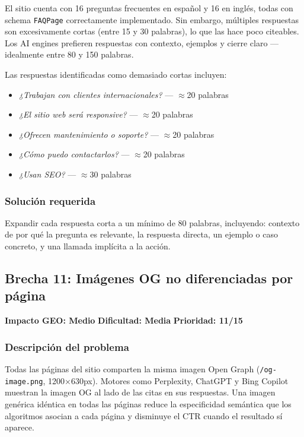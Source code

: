 \documentclass[12pt, a4paper]{article}
\begin{document}
El sitio cuenta con 16 preguntas frecuentes en español y 16 en inglés, todas con schema \texttt{FAQPage} correctamente implementado. Sin embargo, múltiples respuestas son excesivamente cortas (entre 15 y 30 palabras), lo que las hace poco citeables. Los AI engines prefieren respuestas con contexto, ejemplos y cierre claro —idealmente entre 80 y 150 palabras.

Las respuestas identificadas como demasiado cortas incluyen:
\begin{itemize}[itemsep=2pt]
  \item \textit{¿Trabajan con clientes internacionales?} — $\approx$20 palabras
  \item \textit{¿El sitio web será responsive?} — $\approx$20 palabras
  \item \textit{¿Ofrecen mantenimiento o soporte?} — $\approx$20 palabras
  \item \textit{¿Cómo puedo contactarlos?} — $\approx$20 palabras
  \item \textit{¿Usan SEO?} — $\approx$30 palabras
\end{itemize}

\subsubsection{Solución requerida}

Expandir cada respuesta corta a un mínimo de 80 palabras, incluyendo: contexto de por qué la pregunta es relevante, la respuesta directa, un ejemplo o caso concreto, y una llamada implícita a la acción.

\subsection{Brecha 11: Imágenes OG no diferenciadas por página}

\begin{medbox}
\textbf{Impacto GEO: Medio} \quad \textbf{Dificultad: Media} \quad \textbf{Prioridad: 11/15}
\end{medbox}

\subsubsection{Descripción del problema}

Todas las páginas del sitio comparten la misma imagen Open Graph (\texttt{/og-image.png}, 1200×630px). Motores como Perplexity, ChatGPT y Bing Copilot muestran la imagen OG al lado de las citas en sus respuestas. Una imagen genérica idéntica en todas las páginas reduce la especificidad semántica que los algoritmos asocian a cada página y disminuye el CTR cuando el resultado sí aparece.
\end{document}

